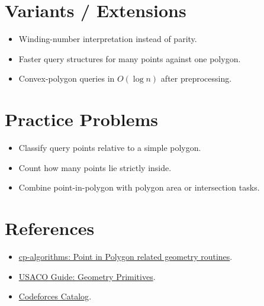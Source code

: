 \section*{Variants / Extensions}

\begin{itemize}
  \item Winding-number interpretation instead of parity.
  \item Faster query structures for many points against one polygon.
  \item Convex-polygon queries in \(O(\log n)\) after preprocessing.
\end{itemize}

\section*{Practice Problems}

\begin{itemize}
  \item Classify query points relative to a simple polygon.
  \item Count how many points lie strictly inside.
  \item Combine point-in-polygon with polygon area or intersection tasks.
\end{itemize}

\section*{References}

\begin{itemize}
  \item \href{https://cp-algorithms.com/geometry/point-in-convex-polygon.html}{cp-algorithms: Point in Polygon related geometry routines}.
  \item \href{https://usaco.guide/plat/geo-prims}{USACO Guide: Geometry Primitives}.
  \item \href{https://codeforces.com/catalog}{Codeforces Catalog}.
\end{itemize}
